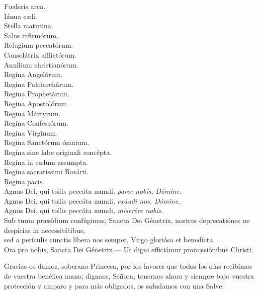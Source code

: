\documentclass[./rosary.tex]{subfiles}
\begin{document}
\begin{multicols}{2}
    Fœderis arca.\\
    Iánua cæli.\\
    Stella matutina.\\
    Salus infirmórum.\\
    Refugium peccatórum.\\
    Consolátrix af­flic­tórum.\\
    Auxílium chris­tia­nórum.\\
    Regina Angelórum.\\
    Regina Pa­triar­chárum.\\
    Regina Pro­phe­tárum.\\
    Regina Apos­to­lórum.\\
    Regina Mártyrum.\\
    Regina Con­fe­ssórum.\\
    Regina Vírginum.\\
    Regina Sanctórum ómnium.\\
    Regina sine labe originali concépta.\\
    Regina in cælum assumpta.\\
    Regina sa­cra­tíssimi Rosárii.\\
    Regina pacis.\\
    Agnus Dei, qui tollis peccáta mundi, \emph{parce nobis, Dómine}.\\
    Agnus Dei, qui tollis peccáta mundi, \emph{exáudi nos, Dómine}.\\
    Agnus Dei, qui tollis peccáta mundi, \emph{miserére nobis}.\\
    Sub tuum præsídium confúgimus, Sancta Dei Génetrix, nostras de­pre­ca­tiónes ne despícias in ne­ces­si­tátibus;\\
    sed a perículis cunctis líbera nos semper, Virgo gloriósa et benedícta.\\
    Ora pro nobis, Sancta Dei Génetrix.--- Ut digni efficiámur pro­mi­ssiónibus Christi.
\end{multicols}

Gracias os damos, soberana Princesa, por los favores que todos los días recibimos de vuestra benéfica mano; dignaos, Señora, tenernos ahora
y siempre bajo vuestra protección y amparo y para más obligados, os saludamos con una Salve:
\end{document}
